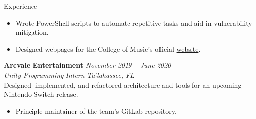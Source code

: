 \documentclass{resume} %
\begin{document}
\begin{rSection}{Experience}
\begin{itemize}
			\vspace{-0.2cm} \item Wrote PowerShell scripts to automate repetitive tasks and aid in vulnerability mitigation.\vspace{-0.2cm} \item Designed webpages for the College of Music's official {\color{cyan} \href{https://music.fsu.edu/ensembles/orchestras/audition-information-orchestras}{website}}.
		\end{itemize}
		{\bf Arcvale Entertainment} \hfill {\em November 2019 – June 2020}\\
		\textit{Unity Programming Intern} \hfill {\em Tallahassee, FL} \smallskip \\
		Designed, implemented, and refactored architecture and tools for an upcoming Nintendo Switch release.
		\begin{itemize}
			\vspace{-0.2cm} \item Principle maintainer of the team's GitLab repository.
		\end{itemize}
	\end{rSection}
	

	
\end{document}
